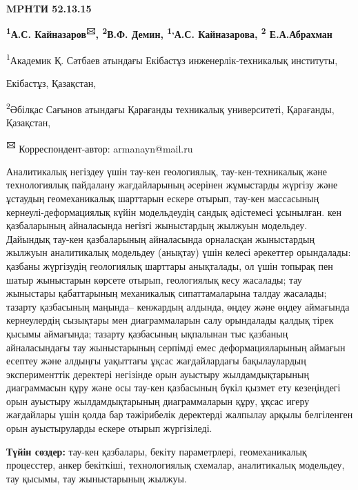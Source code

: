 \newpage
{\bfseries MPHTИ 52.13.15}


\begin{center}
{\bfseries \textsuperscript{1}А.С. Кайназаров\textsuperscript{🖂},
\textsuperscript{2}В.Ф. Демин, \textsuperscript{1,}А.С. Кайназарова,
\textsuperscript{2} Е.А.Абрахман}

\textsuperscript{1}Академик Қ. Сәтбаев атындағы Екібастұз
инженерлік-техникалық институты,

Екібастұз, Қазақстан,

\textsuperscript{2}Әбілқас Сағынов атындағы Қарағанды техникалық
университеті, Қарағанды, Қазақстан,

{\bfseries \textsuperscript{🖂}} Корреспондент-автор: armanayn@mail.ru
\end{center}

Аналитикалық негіздеу үшін тау-кен геологиялық, тау-кен-техникалық және
технологиялық пайдалану жағдайларының әсерінен жұмыстарды жүргізу және
ұстаудың геомеханикалық шарттарын ескере отырып, тау-кен массасының
кернеулі-деформациялық күйін модельдеудің сандық әдістемесі ұсынылған.
кен қазбаларының айналасында негізгі жыныстардың жылжуын модельдеу.
Дайындық тау-кен қазбаларының айналасында орналасқан жыныстардың жылжуын
аналитикалық модельдеу (анықтау) үшін келесі әрекеттер орындалады:
қазбаны жүргізудің геологиялық шарттары анықталады, ол үшін топырақ пен
шатыр жыныстарын көрсете отырып, геологиялық кесу жасалады; тау
жыныстары қабаттарының механикалық сипаттамаларына талдау жасалады;
тазарту қазбасының маңында-- кенжардың алдында, өңдеу және өңдеу
аймағында кернеулердің сызықтары мен диаграммаларын салу орындалады
қалдық тірек қысымы аймағында; тазарту қазбасының ықпалынан тыс қазбаның
айналасындағы тау жыныстарының серпімді емес деформацияларының аймағын
есептеу және алдыңғы уақыттағы ұқсас жағдайлардағы бақылаулардың
эксперименттік деректері негізінде орын ауыстыру жылдамдықтарының
диаграммасын құру және осы тау-кен қазбасының бүкіл қызмет ету
кезеңіндегі орын ауыстыру жылдамдықтарының диаграммаларын құру, ұқсас
игеру жағдайлары үшін қолда бар тәжірибелік деректерді жалпылау арқылы
белгіленген орын ауыстыруларды ескере отырып жүргізіледі.

{\bfseries Түйін сөздер:} тау-кен қазбалары, бекіту параметрлері,
геомеханикалық процесстер, анкер бекіткіші, технологиялық схемалар,
аналитикалық модельдеу, тау қысымы, тау жыныстарының жылжуы.

